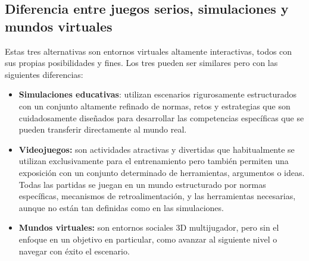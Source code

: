 \subsection{Diferencia entre juegos serios, simulaciones y mundos virtuales}

Estas tres alternativas son entornos virtuales altamente interactivas, todos con
sus propias posibilidades y fines. Los tres pueden ser similares
pero con las siguientes diferencias\cite{education:games}:

\begin{itemize}
\item \textbf{Simulaciones educativas}: utilizan escenarios rigurosamente
    estructurados con un conjunto altamente refinado de normas, retos y
    estrategias que son cuidadosamente diseñados para desarrollar las
    competencias específicas que se pueden transferir directamente al mundo
    real.
\item \textbf{Videojuegos:} son actividades atractivas y divertidas que
    habitualmente se utilizan exclusivamente para el entrenamiento pero también
    permiten una exposición con un conjunto determinado de herramientas,
    argumentos o ideas. Todas las partidas se juegan en un mundo estructurado
    por normas específicas, mecanismos de retroalimentación, y las herramientas
    necesarias, aunque no están tan definidas como en las simulaciones.
\item \textbf{Mundos virtuales:} son entornos sociales 3D multijugador, pero sin
    el enfoque en un objetivo en particular, como avanzar al siguiente nivel o
    navegar con éxito el escenario.
\end{itemize}
